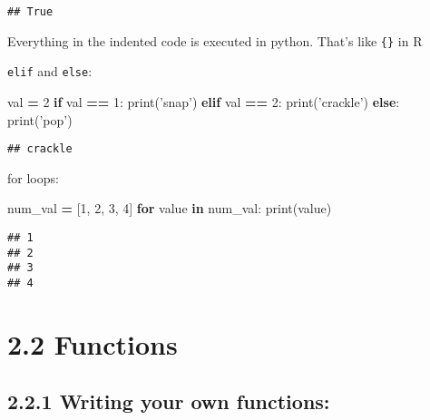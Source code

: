 \documentclass[]{book}
\newenvironment{Shaded}{\begin{snugshade}}{\end{snugshade}}
\newcommand{\BuiltInTok}[1]{#1}
\newcommand{\ControlFlowTok}[1]{\textcolor[rgb]{0.13,0.29,0.53}{\textbf{#1}}}
\newcommand{\DecValTok}[1]{\textcolor[rgb]{0.00,0.00,0.81}{#1}}
\newcommand{\KeywordTok}[1]{\textcolor[rgb]{0.13,0.29,0.53}{\textbf{#1}}}
\newcommand{\NormalTok}[1]{#1}
\newcommand{\OperatorTok}[1]{\textcolor[rgb]{0.81,0.36,0.00}{\textbf{#1}}}
\newcommand{\StringTok}[1]{\textcolor[rgb]{0.31,0.60,0.02}{#1}}
\theoremstyle{definition}
\theoremstyle{definition}
\theoremstyle{definition}
\theoremstyle{remark}
\begin{document}
\begin{verbatim}
## True
\end{verbatim}

Everything in the indented code is executed in python. That's like
\texttt{\{\}} in R

\texttt{elif} and \texttt{else}:

\begin{Shaded}
\begin{Highlighting}[]
\NormalTok{val }\OperatorTok{=} \DecValTok{2}
\ControlFlowTok{if}\NormalTok{ val }\OperatorTok{==} \DecValTok{1}\NormalTok{:}
    \BuiltInTok{print}\NormalTok{(}\StringTok{'snap'}\NormalTok{)}
\ControlFlowTok{elif}\NormalTok{ val }\OperatorTok{==} \DecValTok{2}\NormalTok{:}
    \BuiltInTok{print}\NormalTok{(}\StringTok{'crackle'}\NormalTok{)}
\ControlFlowTok{else}\NormalTok{:}
    \BuiltInTok{print}\NormalTok{(}\StringTok{'pop'}\NormalTok{)}
\end{Highlighting}
\end{Shaded}

\begin{verbatim}
## crackle
\end{verbatim}

for loops:

\begin{Shaded}
\begin{Highlighting}[]
\NormalTok{num_val }\OperatorTok{=}\NormalTok{ [}\DecValTok{1}\NormalTok{, }\DecValTok{2}\NormalTok{, }\DecValTok{3}\NormalTok{, }\DecValTok{4}\NormalTok{]}
\ControlFlowTok{for}\NormalTok{ value }\KeywordTok{in}\NormalTok{ num_val:}
    \BuiltInTok{print}\NormalTok{(value)}
\end{Highlighting}
\end{Shaded}

\begin{verbatim}
## 1
## 2
## 3
## 4
\end{verbatim}

\hypertarget{functions}{%
\section{2.2 Functions}\label{functions}}

\hypertarget{writing-your-own-functions}{%
\subsection{2.2.1 Writing your own
functions:}\label{writing-your-own-functions}}
\end{document}
